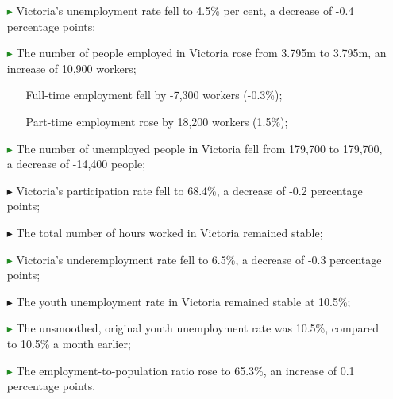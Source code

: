\begin{itemize}
\setlength\itemsep{3pt}
\item[\textcolor{forestgreen}{{\symbolfont ▸}}] Victoria’s unemployment rate fell to 4.5\% per cent, a decrease of -0.4 percentage points;
\item[\textcolor{forestgreen}{{\symbolfont ▸}}] The number of people employed in Victoria rose from 3.795m to 3.795m, an increase of 10,900 workers;
\begin{enumerate}  \item[\textcolor{burntorange}{\bullet}] Full-time employment fell by -7,300 workers (-0.3\%);
\item[\textcolor{forestgreen}{\bullet}] Part-time employment rose by 18,200 workers (1.5\%);
\end{enumerate}  \item[\textcolor{forestgreen}{{\symbolfont ▸}}] The number of unemployed people in Victoria fell from 179,700 to 179,700, a decrease of -14,400 people;
\item[\textcolor{burntorange}{{\symbolfont ▸}}] Victoria's participation rate fell to 68.4\%, a decrease of -0.2 percentage points;
\item[\textcolor{coolgrey}{{\symbolfont ▸}}] The total number of hours worked in Victoria remained stable;
\item[\textcolor{forestgreen}{{\symbolfont ▸}}] Victoria's underemployment rate fell to 6.5\%, a decrease of -0.3 percentage points;
\item[\textcolor{coolgrey}{{\symbolfont ▸}}] The youth unemployment rate in Victoria remained stable at 10.5\%;
\item[\textcolor{forestgreen}{{\symbolfont ▸}}] The unsmoothed, original youth unemployment rate was 10.5\%, compared to 10.5\% a month earlier;
\item[\textcolor{forestgreen}{{\symbolfont ▸}}] The employment-to-population ratio rose to 65.3\%, an increase of 0.1 percentage points.
\end{itemize}
